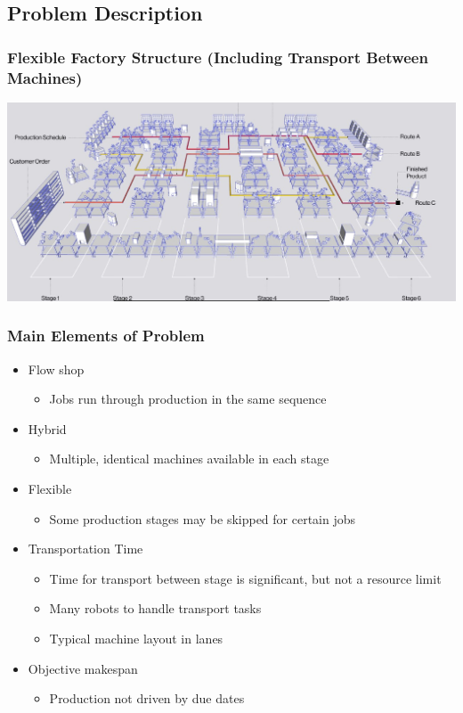 \subsection{Problem Description}

\begin{frame}
\frametitle{Flexible Factory Structure (Including Transport Between Machines)}
\includegraphics[width=14cm]{imagesjj/factory}
\end{frame}

\begin{frame}
\frametitle{Main Elements of Problem}
\begin{itemize}
\item Flow shop
\begin{itemize}
\item Jobs run through production in the same sequence
\end{itemize}

\item Hybrid
\begin{itemize}
\item Multiple, identical machines available in each stage
\end{itemize}

\item Flexible
\begin{itemize}
\item Some production stages may be skipped for certain jobs
\end{itemize}

\item Transportation Time
\begin{itemize}
\item Time for transport between stage is significant, but not a resource limit
\item Many robots to handle transport tasks
\item Typical machine layout in lanes
\end{itemize}

\item Objective makespan
\begin{itemize}
\item Production not driven by due dates
\end{itemize}
\end{itemize}
\end{frame}

